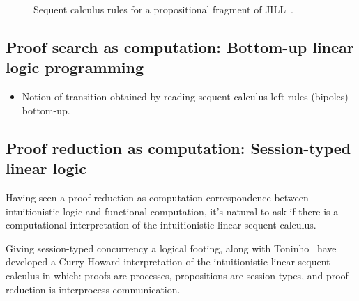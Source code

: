 \begin{figure}
  \caption{Sequent calculus rules for a propositional fragment of \acf{JILL}~\autocite{Chang+:CMU03}.\label{fig:seq-jill}}
\end{figure}

\subsection{Proof search as computation: Bottom-up linear logic programming}\label{sec:linear-lp}

\begin{itemize}
\item Notion of transition obtained by reading sequent calculus left rules  (bipoles) bottom-up.
\end{itemize}

\subsection{Proof reduction as computation: Session-typed linear logic}\label{sec:async-sill}

Having seen a proof-reduction-as-computation correspondence between intuitionistic logic and functional computation, it's natural to ask if there is a computational interpretation of the intuitionistic linear sequent calculus.


Giving session-typed concurrency a logical footing, \textcite{Caires+Pfenning:CONCUR10} along with Toninho~\autocite*{Caires+:TLDI12} have developed a Curry-Howard interpretation of the intuitionistic linear sequent calculus in which: proofs are processes, propositions are session types, and proof reduction is interprocess communication.


